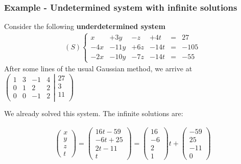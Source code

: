 \documentclass[usenames,dvipsnames,aspectratio=169,10pt]{beamer}
\numberwithin{equation}{section}
\begin{document}
\begin{frame}
\frametitle{Example - Undetermined system with infinite solutions}
Consider the following \textbf{underdetermined system}
\begin{align*}
(S)
\left\{
\begin{matrix}
    x &  +3y &   -z &  +4t &=&   27 \\
  -4x & -11y &  +6z & -14t &=& -105 \\
  -2x & -10y &  -7z & -14t &=&  -55
\end{matrix}
\right.
\end{align*}
After some lines of the usual Gaussian method, we arrive at $\left(
	\begin{matrix}
	   1 &   3 &  -1 &   4 \\
	   0 &   1 &   2 &   2 \\
	   0 &   0 &  -1 &   2
	\end{matrix}
  \left|
	\begin{matrix}
	    27 \\
	     3 \\
	    11 \\
	\end{matrix}
  \right.
\right)$

\begin{minipage}{0.35\textwidth}
We already solved this system. The infinite solutions are:
\end{minipage}
\begin{minipage}{0.60\textwidth}
\begin{align*}
\begin{pmatrix}
   x \\
   y \\
   z \\
   t
\end{pmatrix}
=
\begin{pmatrix}
   16t - 59 \\
   -6t + 25\\
    2t - 11\\
     t
\end{pmatrix}
=
\begin{pmatrix}
   16 \\
    -6 \\
   2\\
   1
\end{pmatrix}
t
+
\begin{pmatrix}
   -59 \\
    25 \\
   -11 \\
     0
\end{pmatrix}
\end{align*}
\end{minipage}


\end{frame}
\end{document}
